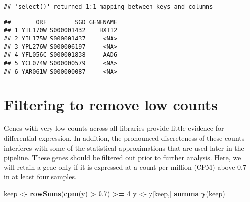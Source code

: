 \documentclass[
]{book}
\newenvironment{Shaded}{\begin{snugshade}}{\end{snugshade}}
\newcommand{\AttributeTok}[1]{\textcolor[rgb]{0.13,0.29,0.53}{#1}}
\newcommand{\DecValTok}[1]{\textcolor[rgb]{0.00,0.00,0.81}{#1}}
\newcommand{\FloatTok}[1]{\textcolor[rgb]{0.00,0.00,0.81}{#1}}
\newcommand{\FunctionTok}[1]{\textcolor[rgb]{0.13,0.29,0.53}{\textbf{#1}}}
\newcommand{\NormalTok}[1]{#1}
\newcommand{\OtherTok}[1]{\textcolor[rgb]{0.56,0.35,0.01}{#1}}
\newcommand{\SpecialCharTok}[1]{\textcolor[rgb]{0.81,0.36,0.00}{\textbf{#1}}}
\newcommand{\StringTok}[1]{\textcolor[rgb]{0.31,0.60,0.02}{#1}}
\begin{document}
\begin{Shaded}
\end{Shaded}

\begin{verbatim}
## 'select()' returned 1:1 mapping between keys and columns
\end{verbatim}

\begin{Shaded}
\end{Shaded}

\begin{verbatim}
##       ORF        SGD GENENAME
## 1 YIL170W S000001432    HXT12
## 2 YIL175W S000001437     <NA>
## 3 YPL276W S000006197     <NA>
## 4 YFL056C S000001838     AAD6
## 5 YCL074W S000000579     <NA>
## 6 YAR061W S000000087     <NA>
\end{verbatim}

\hypertarget{filtering-to-remove-low-counts}{%
\section{Filtering to remove low counts}\label{filtering-to-remove-low-counts}}

Genes with very low counts across all libraries provide little evidence
for differential expression. In addition, the pronounced discreteness
of these counts interferes with some of the statistical approximations
that are used later in the pipeline. These genes should be filtered out
prior to further analysis. Here, we will retain a gene only if it is
expressed at a count-per-million (CPM) above 0.7 in at least four
samples.

\begin{Shaded}
\begin{Highlighting}[]
\NormalTok{keep }\OtherTok{\textless{}{-}} \FunctionTok{rowSums}\NormalTok{(}\FunctionTok{cpm}\NormalTok{(y) }\SpecialCharTok{\textgreater{}} \FloatTok{0.7}\NormalTok{) }\SpecialCharTok{\textgreater{}=} \DecValTok{4}
\NormalTok{y }\OtherTok{\textless{}{-}}\NormalTok{ y[keep,]}
\FunctionTok{summary}\NormalTok{(keep)}
\end{Highlighting}
\end{Shaded}
\end{document}
